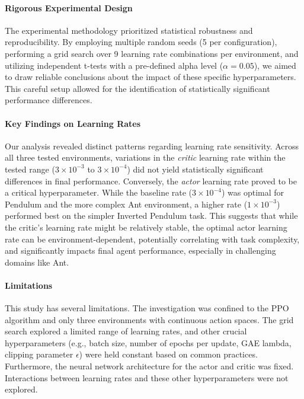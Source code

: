 \documentclass{article}
\begin{document}
\paragraph{Rigorous Experimental Design}
The experimental methodology prioritized statistical robustness and reproducibility. By employing multiple random seeds (5 per configuration), performing a grid search over 9 learning rate combinations per environment, and utilizing independent t-tests with a pre-defined alpha level (\(\alpha=0.05\)), we aimed to draw reliable conclusions about the impact of these specific hyperparameters. This careful setup allowed for the identification of statistically significant performance differences.

\paragraph{Key Findings on Learning Rates}
Our analysis revealed distinct patterns regarding learning rate sensitivity. Across all three tested environments, variations in the \textit{critic} learning rate within the tested range (\(3 \times 10^{-3}\) to \(3 \times 10^{-4}\)) did not yield statistically significant differences in final performance. Conversely, the \textit{actor} learning rate proved to be a critical hyperparameter. While the baseline rate (\(3 \times 10^{-4}\)) was optimal for Pendulum and the more complex Ant environment, a higher rate (\(1 \times 10^{-3}\)) performed best on the simpler Inverted Pendulum task. This suggests that while the critic's learning rate might be relatively stable, the optimal actor learning rate can be environment-dependent, potentially correlating with task complexity, and significantly impacts final agent performance, especially in challenging domains like Ant.

\paragraph{Limitations}
This study has several limitations. The investigation was confined to the PPO algorithm and only three environments with continuous action spaces. The grid search explored a limited range of learning rates, and other crucial hyperparameters (e.g., batch size, number of epochs per update, GAE lambda, clipping parameter \(\epsilon\)) were held constant based on common practices. Furthermore, the neural network architecture for the actor and critic was fixed. Interactions between learning rates and these other hyperparameters were not explored.
\end{document}
